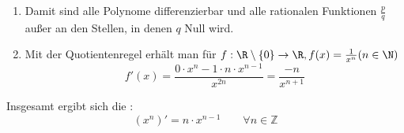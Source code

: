 \begin{enumerate}[leftmargin=*]
    \item Damit sind alle Polynome differenzierbar und alle rationalen Funktionen $\frac{p}{q}$ außer an den Stellen, in denen $q$ Null wird.
    \item Mit der Quotientenregel erhält man für $f: \R \setminus \{0\} \to \R, f(x) = \frac{1}{x^n} (n \in \N)$
    $$f'(x) = \frac{0 \cdot x^n - 1 \cdot n \cdot x^{n-1}}{x^{2n}} = \frac{-n}{x^{n+1}}$$
\end{enumerate}
Insgesamt ergibt sich die :
$$(x^n)' = n \cdot x^{n-1} \qquad \forall n \in \mathbb{Z}$$